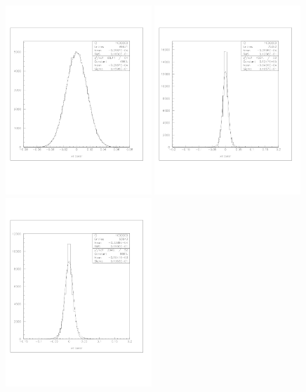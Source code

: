 \documentclass[a4paper]{article}
\begin{document}
\begin{figure}[!htb]
  \centering
  \includegraphics[width=0.49\textwidth]{ex_images/1_005_010_xslabesr.jpg}
  \includegraphics[width=0.49\textwidth]{ex_images/1_005_030_xse.jpg}
  \includegraphics[width=0.49\textwidth]{ex_images/1_005_050_xse.jpg}

\end{figure}
\end{document}
